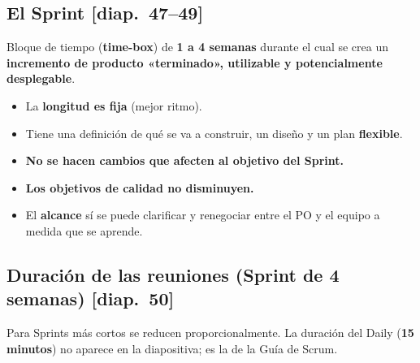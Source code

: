 \documentclass[11pt,a4paper,oneside,openany]{report}
\newcommand{\diap}[1]{\textcolor{mdaPrimary}{\small[diap.~#1]}}
\newcommand{\extra}{\textcolor{mdaOrange}{\small[no está en las diapositivas]}}
\begin{document}
\subsection{El Sprint \diap{47--49}}
\begin{definicion}[Sprint]
Bloque de tiempo (\textbf{time-box}) de \textbf{1 a 4 semanas} durante el cual se crea un \textbf{incremento de producto
«terminado», utilizable y potencialmente desplegable}.
\end{definicion}
\begin{itemize}[leftmargin=*]
  \item La \textbf{longitud es fija} (mejor ritmo).
  \item Tiene una definición de qué se va a construir, un diseño y un plan \textbf{flexible}.
  \item \textbf{No se hacen cambios que afecten al objetivo del Sprint.}
  \item \textbf{Los objetivos de calidad no disminuyen.}
  \item El \textbf{alcance} sí se puede clarificar y renegociar entre el PO y el equipo a medida que se aprende.
\end{itemize}

\subsection{Duración de las reuniones (Sprint de 4 semanas) \diap{50}}
\begin{center}
\end{center}
Para Sprints más cortos se reducen proporcionalmente. La duración del Daily (\textbf{15 minutos}) no aparece en la
diapositiva; es la de la Guía de Scrum.
\end{document}
